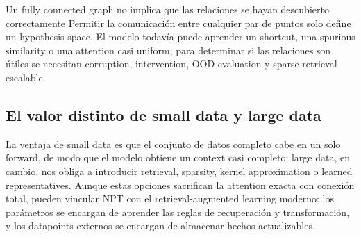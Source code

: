 
\begin{warningbox}{Un fully connected graph no implica que las relaciones se hayan descubierto correctamente}
Permitir la comunicación entre cualquier par de puntos solo define un hypothesis space. El modelo todavía puede aprender un shortcut, una spurious similarity o una attention casi uniform; para determinar si las relaciones son útiles se necesitan corruption, intervention, OOD evaluation y sparse retrieval escalable.
\end{warningbox}

\subsection{El valor distinto de small data y large data}

La ventaja de small data es que el conjunto de datos completo cabe en un solo forward, de modo que el modelo obtiene un context casi completo; large data, en cambio, nos obliga a introducir retrieval, sparsity, kernel approximation o learned representatives. Aunque estas opciones sacrifican la attention exacta con conexión total, pueden vincular NPT con el retrieval-augmented learning moderno: los parámetros se encargan de aprender las reglas de recuperación y transformación, y los datapoints externos se encargan de almacenar hechos actualizables.


